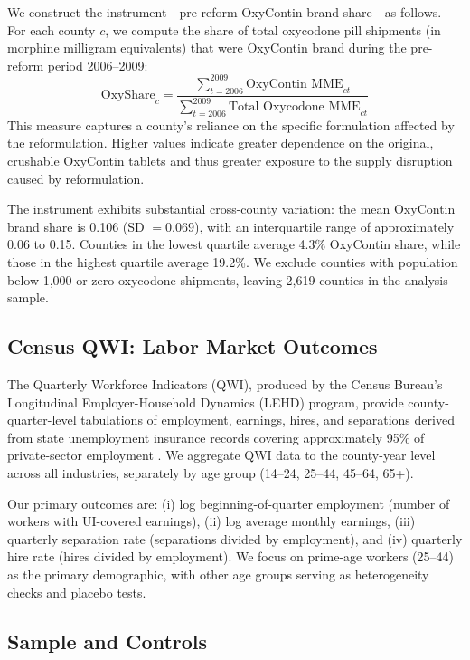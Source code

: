 \documentclass[12pt]{article}
\begin{document}
We construct the instrument---pre-reform OxyContin brand share---as follows. For each county $c$, we compute the share of total oxycodone pill shipments (in morphine milligram equivalents) that were OxyContin brand during the pre-reform period 2006--2009:
\begin{equation}
\text{OxyShare}_c = \frac{\sum_{t=2006}^{2009} \text{OxyContin MME}_{ct}}{\sum_{t=2006}^{2009} \text{Total Oxycodone MME}_{ct}}
\label{eq:oxyshare}
\end{equation}
This measure captures a county's reliance on the specific formulation affected by the reformulation. Higher values indicate greater dependence on the original, crushable OxyContin tablets and thus greater exposure to the supply disruption caused by reformulation.

The instrument exhibits substantial cross-county variation: the mean OxyContin brand share is 0.106 (SD $= 0.069$), with an interquartile range of approximately 0.06 to 0.15. Counties in the lowest quartile average 4.3\% OxyContin share, while those in the highest quartile average 19.2\%. We exclude counties with population below 1,000 or zero oxycodone shipments, leaving 2,619 counties in the analysis sample.

\subsection{Census QWI: Labor Market Outcomes}

The Quarterly Workforce Indicators (QWI), produced by the Census Bureau's Longitudinal Employer-Household Dynamics (LEHD) program, provide county-quarter-level tabulations of employment, earnings, hires, and separations derived from state unemployment insurance records covering approximately 95\% of private-sector employment \citep{abowd2009}. We aggregate QWI data to the county-year level across all industries, separately by age group (14--24, 25--44, 45--64, 65+).

Our primary outcomes are: (i) log beginning-of-quarter employment (number of workers with UI-covered earnings), (ii) log average monthly earnings, (iii) quarterly separation rate (separations divided by employment), and (iv) quarterly hire rate (hires divided by employment). We focus on prime-age workers (25--44) as the primary demographic, with other age groups serving as heterogeneity checks and placebo tests.

\subsection{Sample and Controls}
\end{document}
